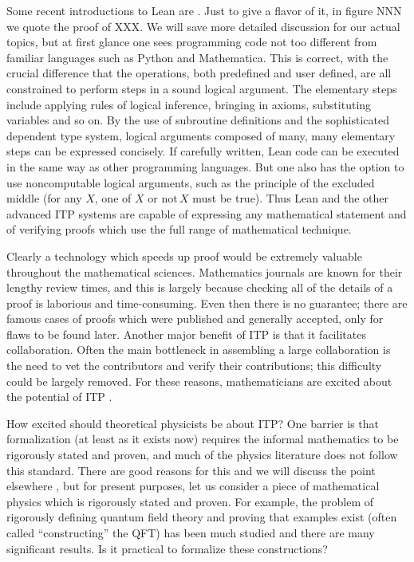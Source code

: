 \documentclass{article}
\newcommand{\SH}[2][blue]{\textcolor{#1}{\footnotesize\sf[#2]}}
\begin{document}
Some recent introductions to Lean are \cite{}.  Just to give a flavor of it, in figure NNN we quote the proof of XXX.
We will save more detailed discussion for our actual topics, but at first glance one sees programming code not too different from familiar languages such as Python and Mathematica.  This is correct, with the crucial difference that the operations, both predefined and user defined, are all constrained to perform steps in a sound logical argument.  The elementary steps include applying rules of logical inference, bringing in axioms, substituting variables and so on.  By the use of subroutine definitions and the sophisticated dependent type system,
logical arguments composed of many, many elementary steps can be expressed concisely.  If carefully written,
Lean code can be executed in the same way as other programming languages.  But one also has the option to use
noncomputable logical arguments, such as the principle of the excluded middle (for any $X$, one of $X$ or $\mbox{not}\, X$ 
must be true).  Thus Lean and the other advanced ITP systems are capable of expressing any mathematical statement
and of verifying proofs which use the full range of mathematical technique.

Clearly a technology which speeds up proof would be extremely valuable throughout the mathematical sciences.  Mathematics journals are known for their lengthy review times, and this is largely because checking all of the details of a proof is laborious and time-consuming.  Even then there is no guarantee; there are famous cases of proofs which were published and generally accepted, only for flaws to be found later.  Another major benefit of ITP is that it facilitates collaboration.  Often the main bottleneck in assembling a large collaboration is the need to vet the contributors and verify their contributions; this difficulty could be largely removed.  For these reasons, mathematicians are excited about the potential of ITP \cite{}.
\SH{We can cite the terry tao announcements }

How excited should theoretical physicists be about ITP?  One barrier is that formalization (at least as it exists now) requires the informal mathematics to be rigorously stated and proven, and much of the physics literature does not follow this standard.  There are good reasons for this and we will discuss the point elsewhere \cite{}, but for present purposes, let us consider a piece of mathematical physics which is rigorously stated and proven.  For example, the problem of rigorously defining quantum field theory and proving that examples exist (often called ``constructing'' the QFT) has been much studied and there are many significant results.  Is it practical to formalize these constructions?
\end{document}
